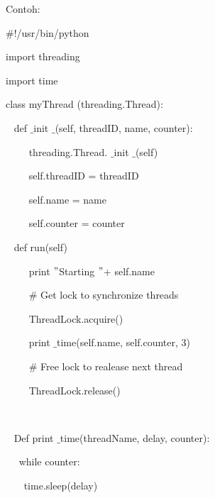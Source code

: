 \noindent 
Contoh: \par
\noindent 
{\fontsize{10pt}{10pt}\selectfont  $  \#  $!/usr/bin/python} \par
\vspace{10pt}
\noindent 
{\fontsize{10pt}{10pt}\selectfont import threading} \par
\noindent 
{\fontsize{10pt}{10pt}\selectfont import time} \par
\vspace{10pt}
\noindent 
{\fontsize{10pt}{10pt}\selectfont class myThread (threading.Thread):} \par
\noindent 
{\fontsize{10pt}{10pt}\selectfont ~ def $  \_  $init $  \_  $(self, threadID, name, counter):} \par
\noindent 
{\fontsize{10pt}{10pt}\selectfont ~~~~ threading.Thread. $  \_  $init $  \_  $(self)} \par
\noindent 
{\fontsize{10pt}{10pt}\selectfont ~~~~ self.threadID = threadID} \par
\noindent 
{\fontsize{10pt}{10pt}\selectfont ~~~~ self.name = name} \par
\noindent 
{\fontsize{10pt}{10pt}\selectfont ~~~~ self.counter = counter} \par
\noindent 
{\fontsize{10pt}{10pt}\selectfont ~ def run(self)} \par
\noindent 
{\fontsize{10pt}{10pt}\selectfont ~~~~ print  $ " $Starting  $ " $+ self.name} \par
\noindent 
{\fontsize{10pt}{10pt}\selectfont ~~~~  $  \#  $ Get lock to synchronize threads} \par
\noindent 
{\fontsize{10pt}{10pt}\selectfont ~~~~ ThreadLock.acquire()} \par
\noindent 
{\fontsize{10pt}{10pt}\selectfont ~~~~ print $  \_  $time(self.name, self.counter, 3)} \par
\noindent 
{\fontsize{10pt}{10pt}\selectfont ~~~~  $  \#  $ Free lock to realease next thread} \par
\noindent 
{\fontsize{10pt}{10pt}\selectfont ~~~~ ThreadLock.release()} \par
\noindent 
{\fontsize{10pt}{10pt}\selectfont ~ } \par
\noindent 
{\fontsize{10pt}{10pt}\selectfont ~ Def print $  \_  $time(threadName, delay, counter):} \par
\noindent 
{\fontsize{10pt}{10pt}\selectfont ~~ while counter:} \par
\noindent 
{\fontsize{10pt}{10pt}\selectfont ~~~ time.sleep(delay)} \par
